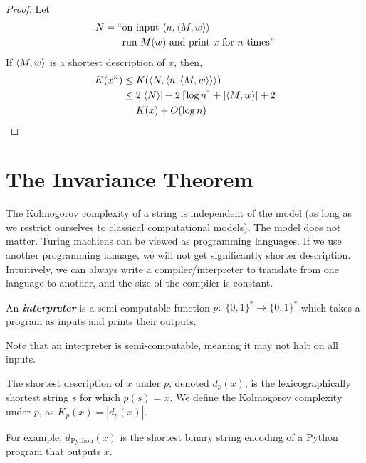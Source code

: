 \begin{proof}
    Let
    $$
    \begin{aligned}
        N = `` &\text{on input $\langle n,\langle M,w \rangle \rangle$} \\
        &\text{run $M(w)$ and print $x$ for $n$ times}
        "
    \end{aligned}
    $$
    If $\langle M,w \rangle$ is a shortest description of $x$, then,
    $$
    \begin{aligned}
        K(x^n) &\leq K(\langle N,\langle n,\langle M,w \rangle \rangle \rangle) \\
        &\leq 2 |\langle N \rangle| + 2 \left\lceil \log n \right\rceil + | \langle M,w \rangle | + 2 \\
        &= K(x) + O(\log n)
    \end{aligned}
    $$
\end{proof}

\section{The Invariance Theorem}

The Kolmogorov complexity of a string is independent of the model (as long as we restrict ourselves to classical computational models). The model does not matter. Turing machiens can be viewed as programming languages. If we use another programming lanuage, we will not get significantly shorter description. Intuitively, we can always write a compiler/interpreter to translate from one language to another, and the size of the compiler is constant.

\begin{definition}[Interpreter]
    An \textit{\textbf{interpreter}} is a semi-computable function $p:\; \{0,1\}^* \to \{0,1\}^*$ which takes a program as inputs and prints their outputs.
\end{definition}

Note that an interpreter is semi-computable, meaning it may not halt on all inputs.

\begin{definition}
    The shortest description of $x$ under $p$, denoted $d_p(x)$, is the lexicographically shortest string $s$ for which $p(s)=x$. We define the Kolmogorov complexity under $p$, as $K_p(x) = |d_p(x)|$.
\end{definition}

\begin{example}
    For example, $d_{\mathrm{Python}}(x)$ is the shortest binary string encoding of a Python program that outputs $x$.
\end{example}

